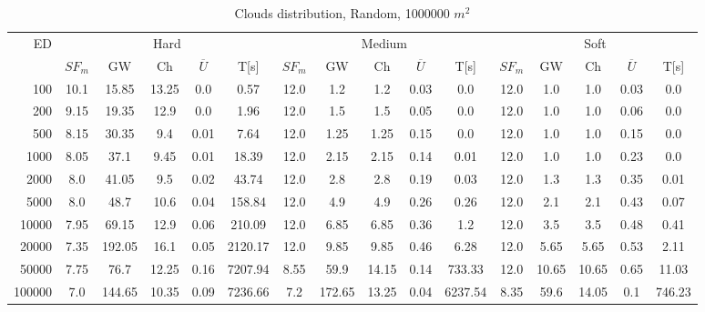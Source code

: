\begin{table}[htb]
	\centering
	\footnotesize
	\begin{tabular}{|r|c|c|c|c|c|c|c|c|c|c|c|c|c|c|c|} 
		\hline
		\multirow{2}{*}{ED} & \multicolumn{5}{c|}{Hard} & \multicolumn{5}{c|}{Medium} &\multicolumn{5}{c|}{Soft} \\ 
		\cline{2-16} 
		&$SF_{m}$&GW & Ch & $\overline{U}$&T[s] &$SF_{m}$&GW & Ch & $\overline{U}$ &T[s] &$SF_{m}$&GW & Ch & $\overline{U}$  & T[s]  \\ 
		\hline 
		100 & 10.1 & 15.85 & 13.25 & 0.0 & 0.57 & 12.0 & 1.2 & 1.2 & 0.03 & 0.0 & 12.0 & 1.0 & 1.0 & 0.03 & 0.0\\ 
		200 & 9.15 & 19.35 & 12.9 & 0.0 & 1.96 & 12.0 & 1.5 & 1.5 & 0.05 & 0.0 & 12.0 & 1.0 & 1.0 & 0.06 & 0.0\\ 
		500 & 8.15 & 30.35 & 9.4 & 0.01 & 7.64 & 12.0 & 1.25 & 1.25 & 0.15 & 0.0 & 12.0 & 1.0 & 1.0 & 0.15 & 0.0\\ 
		1000 & 8.05 & 37.1 & 9.45 & 0.01 & 18.39 & 12.0 & 2.15 & 2.15 & 0.14 & 0.01 & 12.0 & 1.0 & 1.0 & 0.23 & 0.0\\ 
		2000 & 8.0 & 41.05 & 9.5 & 0.02 & 43.74 & 12.0 & 2.8 & 2.8 & 0.19 & 0.03 & 12.0 & 1.3 & 1.3 & 0.35 & 0.01\\ 
		5000 & 8.0 & 48.7 & 10.6 & 0.04 & 158.84 & 12.0 & 4.9 & 4.9 & 0.26 & 0.26 & 12.0 & 2.1 & 2.1 & 0.43 & 0.07\\ 
		10000 & 7.95 & 69.15 & 12.9 & 0.06 & 210.09 & 12.0 & 6.85 & 6.85 & 0.36 & 1.2 & 12.0 & 3.5 & 3.5 & 0.48 & 0.41\\ 
		20000 & 7.35 & 192.05 & 16.1 & 0.05 & 2120.17 & 12.0 & 9.85 & 9.85 & 0.46 & 6.28 & 12.0 & 5.65 & 5.65 & 0.53 & 2.11\\ 
		50000 & 7.75 & 76.7 & 12.25 & 0.16 & 7207.94 & 8.55 & 59.9 & 14.15 & 0.14 & 733.33 & 12.0 & 10.65 & 10.65 & 0.65 & 11.03\\ 
		100000 & 7.0 & 144.65 & 10.35 & 0.09 & 7236.66 & 7.2 & 172.65 & 13.25 & 0.04 & 6237.54 & 8.35 & 59.6 & 14.05 & 0.1 & 746.23\\ 
		\hline 
	\end{tabular} 
	\caption{Clouds distribution, Random, 1000000 $m^2$} 
	\label{tab:UnRandom1000} 
\end{table} 

